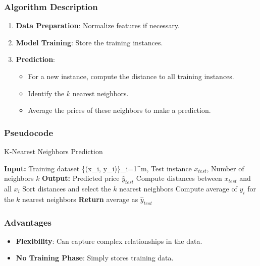 \documentclass[10pt,conference,compsoc]{IEEEtran}
\begin{document}
{\subsubsection{Algorithm Description}

\begin{enumerate}
    \item \textbf{Data Preparation}: Normalize features if necessary.
    \item \textbf{Model Training}: Store the training instances.
    \item \textbf{Prediction}:
    \begin{itemize}
        \item For a new instance, compute the distance to all training instances.
        \item Identify the \(k\) nearest neighbors.
        \item Average the prices of these neighbors to make a prediction.
    \end{itemize}
\end{enumerate}

\subsubsection{Pseudocode}

\begin{algorithm}
\caption{K-Nearest Neighbors Prediction}
\begin{algorithmic}[1]
\STATE \textbf{Input:} Training dataset \{(x_i, y_i)\}_{i=1}^m, Test instance \(x_{test}\), Number of neighbors \(k\)
\STATE \textbf{Output:} Predicted price \(\hat{y}_{test}\)
\STATE Compute distances between \(x_{test}\) and all \(x_i\)
\STATE Sort distances and select the \(k\) nearest neighbors
\STATE Compute average of \(y_i\) for the \(k\) nearest neighbors
\STATE \textbf{Return} average as \(\hat{y}_{test}\)
\end{algorithmic}
\end{algorithm}

\subsubsection{Advantages}

\begin{itemize}
    \item \textbf{Flexibility}: Can capture complex relationships in the data.
    \item \textbf{No Training Phase}: Simply stores training data.
\end{itemize}

}
\end{document}
